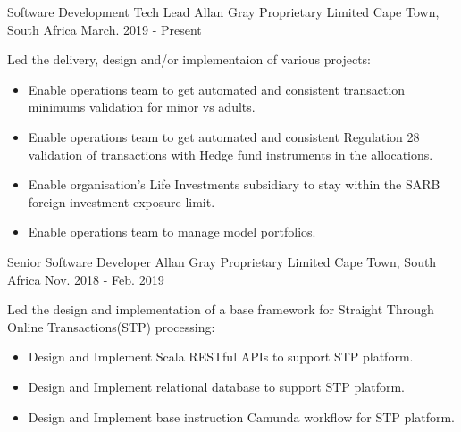 

\begin{cventries}

  \cventry
    {Software Development Tech Lead} %
    {Allan Gray Proprietary Limited} %
    {Cape Town, South Africa} %
    {March. 2019 - Present} %
    {
      \begin{cvitems} %
        \item {Led the delivery, design and/or implementaion of various projects:}  
        \begin{itemize}
          \item {Enable operations team to get automated and consistent transaction minimums validation for minor vs adults.}
          \item {Enable operations team to get automated and consistent Regulation 28 validation of transactions with Hedge fund instruments in the allocations.}
          \item {Enable organisation's Life Investments subsidiary to stay within the SARB foreign investment exposure limit.}
          \item {Enable operations team to manage model portfolios.}
        \end{itemize}
      \end{cvitems}
    }

  \cventry
    {Senior Software Developer} %
    {Allan Gray Proprietary Limited} %
    {Cape Town, South Africa} %
    {Nov. 2018 - Feb. 2019} %
    {
      \begin{cvitems} %
        \item {Led the design and implementation of a base framework for Straight Through Online Transactions(STP) processing:}
        \begin{itemize}
          \item {Design and Implement Scala RESTful APIs to support STP platform.} 
          \item {Design and Implement relational database to support STP platform.} 
          \item {Design and Implement base instruction Camunda workflow for STP platform.} 
        \end{itemize}
      \end{cvitems}
    }


\end{cventries}

